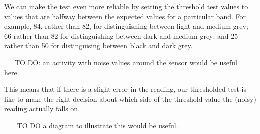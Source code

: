 \documentclass[letterpaper,10pt,english]{sphinxmanual}
\begin{document}
\begin{sphinxVerbatim}[commandchars=\\\{\}]
   
   
   
\end{sphinxVerbatim}

We can make the test even more reliable by setting the threshold test values to values that are halfway between the expected values for a particular band. For example, 84, rather than 82, for distinguishing between light and medium grey; 66 rather than 82 for distinguishing between dark and medium grey; and 25 rather than 50 for distinguising between black and dark grey.

\_\_TO DO: an activity with noise values around the sensor would be useful here.\_

This means that if there is a slight error in the reading, our thresholded test is like to make the right decision about which side of the threshold value the (noisy) reading actually falls on.

\_\_ TO DO \sphinxhyphen{} a diagram to illustrate this would be useful. \_\_
\end{document}
